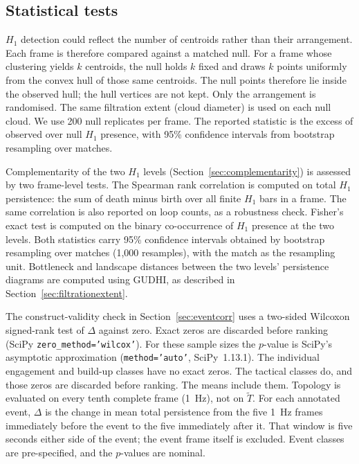 \subsection{Statistical tests}
\label{sec:stats}

$H_1$ detection could reflect the number of centroids rather than
their arrangement. Each frame is therefore compared against a matched
null. For a frame whose clustering yields $k$ centroids, the null
holds $k$ fixed and draws $k$ points uniformly from the convex hull of
those same centroids. The null points therefore lie inside the
observed hull; the hull vertices are not kept. Only the arrangement is
randomised. The same filtration extent (cloud diameter) is used on
each null cloud. We use 200 null replicates per frame. The reported
statistic is the excess of observed over null $H_1$ presence, with
95\% confidence intervals from bootstrap resampling over matches.

Complementarity of the two $H_1$ levels
(Section~\ref{sec:complementarity}) is assessed by two frame-level
tests. The Spearman rank correlation is computed on total $H_1$
persistence: the sum of death minus birth over all finite $H_1$ bars in
a frame. The same correlation is also reported on loop counts, as a
robustness check. Fisher's exact test is computed on the binary
co-occurrence of $H_1$ presence at the two levels. Both statistics
carry 95\% confidence intervals obtained by bootstrap resampling over
matches (1{,}000 resamples), with the match as the resampling unit.
Bottleneck and landscape distances between the two levels' persistence
diagrams are computed using GUDHI, as described in
Section~\ref{sec:filtrationextent}.

The construct-validity check in Section~\ref{sec:eventcorr} uses a
two-sided Wilcoxon signed-rank test of $\Delta$ against zero.
Exact zeros are discarded before ranking (SciPy \texttt{zero\_method='wilcox'}).
For these sample sizes the $p$-value is SciPy's asymptotic approximation
(\texttt{method='auto'}, SciPy~1.13.1). The individual engagement and build-up classes have no exact zeros.
The tactical classes do, and those zeros are discarded before ranking.
The means include them.
Topology is evaluated on every tenth complete frame (1~Hz), not on
$\tilde{T}$. For each annotated event, $\Delta$ is the change in mean
total persistence from the five 1~Hz frames immediately before the
event to the five immediately after it. That window is five seconds
either side of the event; the event frame itself is excluded.
Event classes are pre-specified, and the $p$-values are nominal.

